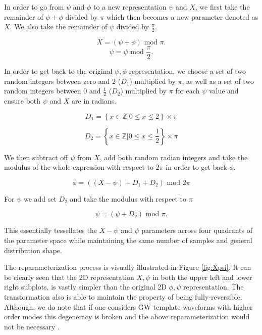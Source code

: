 In order to 
go from $\psi$ and $\phi$ to a new representation $\psi$ and $X$, we first take the 
remainder of $\psi + \phi$ divided by $\pi$ which then becomes a new parameter denoted as $X$.
We also take the remainder of $\psi$ divided by $\frac{\pi}{2}$.

\begin{equation}
    X = (\psi + \phi) \textrm{ mod } \pi.
\end{equation}
\begin{equation}
    \psi = \psi \textrm{ mod } \frac{\pi}{2}. 
\end{equation}

In order to get back to the original $\psi, \phi$ representation, we choose a set of two random integers between zero 
and $2$ ($D_1$) multiplied by $\pi$, as well as a set of two random integers between $0$ and $\frac{1}{2}$ ($D_2$)
multiplied by $\pi$ for each $\psi$ value and ensure both $\psi$ and $X$ are in radians.

\begin{equation}
    D_{1}=\left\{ x\in\mathbb{Z}|0\leq x\leq 2 \right\} \times \pi
\end{equation}

\begin{equation}
    D_{2}=\left\{ x\in\mathbb{Z}|0\leq x\leq \frac{1}{2} \right\} \times \pi
\end{equation}

We then subtract off $\psi$ from $X$, add both random radian integers and take the modulus 
of the whole expression with respect to $2\pi$ in order to get back $\phi$. 

\begin{equation}
    \phi = ((X - \psi) + D_{1} + D_{2}) \textrm{ mod } 2\pi     
\end{equation}

For $\psi$ we add set $D_2$ and take the modulus with respect to $\pi$

\begin{equation}
    \psi = (\psi + D_2) \textrm{ mod } \pi.
\end{equation}

This essentially tessellates the $X-\psi$ and $\psi$ parameters across 
four quadrants of the parameter space while maintaining the same number of samples and 
 general distribution shape.

The reparameterization process is visually illustrated in Figure \ref{fig:Xpsi}. It can be clearly seen 
that the 2D representation $X, \psi$ in both the upper left and lower right subplots, is vastly 
simpler than the original 2D $\phi, \psi$ representation. The transformation also 
is able to maintain the property of being fully-reversible. Although, we do note that 
if one considers \ac{GW} template waveforms with higher order modes this degeneracy is 
broken and the above reparameterization would not be necessary \cite{10.1093/mnras/stv1584}.

